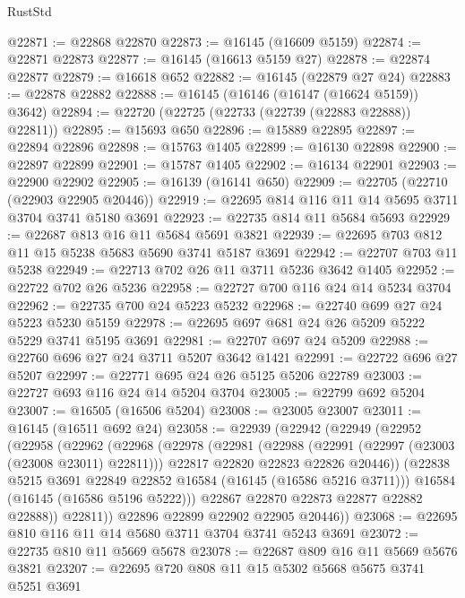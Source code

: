 \begin{lexlean}{RustStd}
\begin{coremodule}
@22871 := @22868 @22870
@22873 := @16145 (@16609 @5159)
@22874 := @22871 @22873
@22877 := @16145 (@16613 @5159 @27)
@22878 := @22874 @22877
@22879 := @16618 @652
@22882 := @16145 (@22879 @27 @24)
@22883 := @22878 @22882
@22888 := @16145 (@16146 (@16147 (@16624 @5159)) @3642)
@22894 := @22720 (@22725 (@22733 (@22739 (@22883 @22888)) @22811))
@22895 := @15693 @650
@22896 := @15889 @22895
@22897 := @22894 @22896
@22898 := @15763 @1405
@22899 := @16130 @22898
@22900 := @22897 @22899
@22901 := @15787 @1405
@22902 := @16134 @22901
@22903 := @22900 @22902
@22905 := @16139 (@16141 @650)
@22909 := @22705 (@22710 (@22903 @22905 @20446))
@22919 := @22695 @814 @116 @11 @14 @5695 @3711 @3704 @3741 @5180 @3691
@22923 := @22735 @814 @11 @5684 @5693
@22929 := @22687 @813 @16 @11 @5684 @5691 @3821
@22939 := @22695 @703 @812 @11 @15 @5238 @5683 @5690 @3741 @5187 @3691
@22942 := @22707 @703 @11 @5238
@22949 := @22713 @702 @26 @11 @3711 @5236 @3642 @1405
@22952 := @22722 @702 @26 @5236
@22958 := @22727 @700 @116 @24 @14 @5234 @3704
@22962 := @22735 @700 @24 @5223 @5232
@22968 := @22740 @699 @27 @24 @5223 @5230 @5159
@22978 := @22695 @697 @681 @24 @26 @5209 @5222 @5229 @3741 @5195 @3691
@22981 := @22707 @697 @24 @5209
@22988 := @22760 @696 @27 @24 @3711 @5207 @3642 @1421
@22991 := @22722 @696 @27 @5207
@22997 := @22771 @695 @24 @26 @5125 @5206 @22789
@23003 := @22727 @693 @116 @24 @14 @5204 @3704
@23005 := @22799 @692 @5204
@23007 := @16505 (@16506 @5204)
@23008 := @23005 @23007
@23011 := @16145 (@16511 @692 @24)
@23058 := @22939
    (@22942
      (@22949
        (@22952
          (@22958
            (@22962
              (@22968
                (@22978
                  (@22981
                    (@22988
                      (@22991 (@22997 (@23003 (@23008 @23011) @22811)))
                      @22817
                      @22820
                      @22823
                      @22826
                      @20446))
                  (@22838 @5215 @3691 @22849 @22852 @16584 (@16145 (@16586 @5216 @3711)))
                  @16584
                  (@16145 (@16586 @5196 @5222)))
                @22867
                @22870
                @22873
                @22877
                @22882
                @22888))
            @22811))
        @22896
        @22899
        @22902
        @22905
        @20446))
@23068 := @22695 @810 @116 @11 @14 @5680 @3711 @3704 @3741 @5243 @3691
@23072 := @22735 @810 @11 @5669 @5678
@23078 := @22687 @809 @16 @11 @5669 @5676 @3821
@23207 := @22695
    @720
    @808
    @11
    @15
    @5302
    @5668
    @5675
    @3741
    @5251
    @3691

\end{coremodule}
\end{lexlean}

